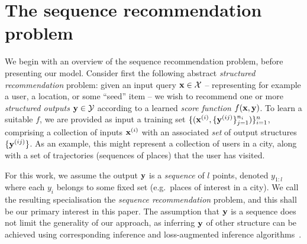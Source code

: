 \secmoveup
\section{The sequence recommendation problem}
\label{sec:recseq}
\textmoveup

We begin with an overview of the sequence recommendation problem, before presenting our model.
Consider first the following abstract
\emph{structured recommendation} problem:
given an input query $\mathbf{x} \in \mathcal{X}$ -- representing for example a user, a location, or some ``seed'' item --
we wish to recommend one or more \emph{structured outputs} $\mathbf{y} \in \mathcal{Y}$ according to a learned \emph{score function} $f(\mathbf{x},\mathbf{y})$.
To learn a suitable $f$,
we are provided as input a training set
$\{ ( \mathbf{x}^{({i})}, \{ \mathbf{y}^{({ij})} \}_{j=1}^{n_i} ) \}_{i=1}^{n}$,
comprising a collection of inputs $\mathbf{x}^{({i})}$ with an associated \emph{set} of output structures $\{ \mathbf{y}^{({ij})} \}$.
As an example, this might represent a collection of users in a city, along with a set of trajectories (sequences of places) that the user has visited.

For this work, we assume the output $\mathbf{y}$ is a \emph{sequence} of $l$ points, denoted $y_{1:l}$
where each $y_i$ belongs to some fixed set (e.g.\ places of interest in a city).
We call the resulting specialisation the \emph{sequence recommendation} problem,
and this shall be our primary interest in this paper.
The assumption that $\mathbf{y}$ is a sequence does not limit the generality of our approach,
as inferring $\mathbf{y}$ of other structure can be achieved using corresponding inference and loss-augmented inference algorithms~\cite{joachims2009predicting}.  %

